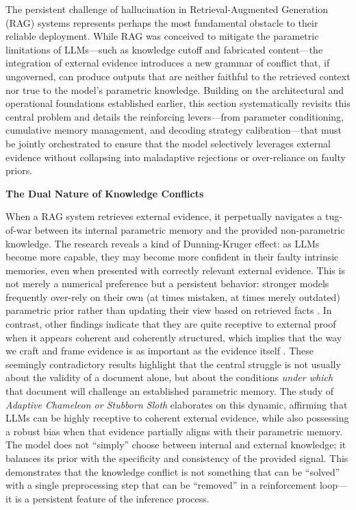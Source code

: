 \documentclass[11pt]{article}
\begin{document}
The persistent challenge of hallucination in Retrieval-Augmented Generation (RAG) systems represents perhaps the most fundamental obstacle to their reliable deployment. While RAG was conceived to mitigate the parametric limitations of LLMs---such as knowledge cutoff and fabricated content---the integration of external evidence introduces a new grammar of conflict that, if ungoverned, can produce outputs that are neither faithful to the retrieved context nor true to the model's parametric knowledge. Building on the architectural and operational foundations established earlier, this section systematically revisits this central problem and details the reinforcing levers---from parameter conditioning, cumulative memory management, and decoding strategy calibration---that must be jointly orchestrated to ensure that the model selectively leverages external evidence without collapsing into maladaptive rejections or over-reliance on faulty priors.

\textbf{The Dual Nature of Knowledge Conflicts}

When a RAG system retrieves external evidence, it perpetually navigates a tug-of-war between its internal parametric memory and the provided non-parametric knowledge. The research reveals a kind of Dunning-Kruger effect: as LLMs become more capable, they may become more confident in their faulty intrinsic memories, even when presented with correctly relevant external evidence. This is not merely a numerical preference but a persistent behavior: stronger models frequently over-rely on their own (at times mistaken, at times merely outdated) parametric prior rather than updating their view based on retrieved facts \cite{ref253}. In contrast, other findings indicate that they are quite receptive to external proof when it appears coherent and coherently structured, which implies that the way we craft and frame evidence is as important as the evidence itself \cite{ref63}. These seemingly contradictory results highlight that the central struggle is not usually about the validity of a document alone, but about the conditions \emph{under which} that document will challenge an established parametric memory. The study of \emph{Adaptive Chameleon or Stubborn Sloth} \cite{ref63} elaborates on this dynamic, affirming that LLMs can be highly receptive to coherent external evidence, while also possessing a robust bias when that evidence partially aligns with their parametric memory. The model does not ``simply'' choose between internal and external knowledge; it balances its prior with the specificity and consistency of the provided signal. This demonstrates that the knowledge conflict is not something that can be ``solved'' with a single preprocessing step that can be ``removed'' in a reinforcement loop---it is a persistent feature of the inference process.
\end{document}
